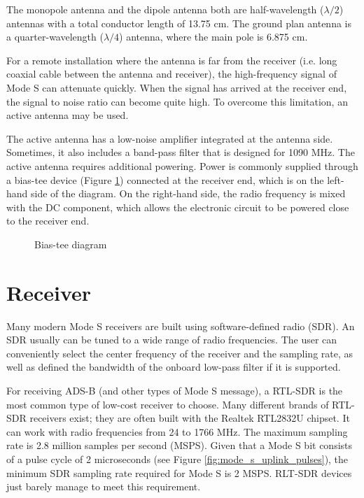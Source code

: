 The monopole antenna and the dipole antenna both are half-wavelength ($\lambda/2$) antennas with a total conductor length of 13.75 cm. The ground plan antenna is a quarter-wavelength ($\lambda/4$) antenna, where the main pole is 6.875 cm.

For a remote installation where the antenna is far from the receiver (i.e. long coaxial cable between the antenna and receiver), the high-frequency signal of Mode S can attenuate quickly. When the signal has arrived at the receiver end, the signal to noise ratio can become quite high. To overcome this limitation, an active antenna may be used.

The active antenna has a low-noise amplifier integrated at the antenna side. Sometimes, it also includes a band-pass filter that is designed for 1090 MHz. The active antenna requires additional powering. Power is commonly supplied through a bias-tee device (Figure \ref{fig:biastee}) connected at the receiver end, which is on the left-hand side of the diagram. On the right-hand side, the radio frequency is mixed with the DC component, which allows the electronic circuit to be powered close to the receiver end.

\begin{figure}[ht]
  \centering
  
  \caption{Bias-tee diagram}
  \label{fig:biastee}
\end{figure}


\section{Receiver}

Many modern Mode S receivers are built using software-defined radio (SDR). An SDR usually can be tuned to a wide range of radio frequencies. The user can conveniently select the center frequency of the receiver and the sampling rate, as well as defined the bandwidth of the onboard low-pass filter if it is supported.

For receiving ADS-B (and other types of Mode S message), a RTL-SDR is the most common type of low-cost receiver to choose. Many different brands of RTL-SDR receivers exist; they are often built with the Realtek RTL2832U chipset. It can work with radio frequencies from 24 to 1766 MHz. The maximum sampling rate is 2.8 million samples per second (MSPS). Given that a Mode S bit consists of a pulse cycle of 2 microseconds (see Figure \ref{fig:mode_s_uplink_pulses}), the minimum SDR sampling rate required for Mode S is 2 MSPS. RLT-SDR devices just barely manage to meet this requirement.

